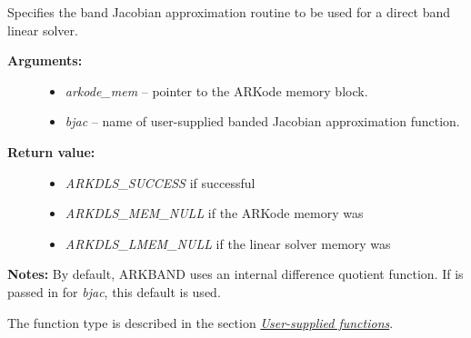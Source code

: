 \documentclass[letterpaper,10pt,english]{sphinxmanual}
\begin{document}
\begin{fulllineitems}
\label{c_interface/User_callable:ARKDlsSetBandJacFn}
Specifies the band Jacobian approximation routine to be
used for a direct band linear solver.
\begin{description}
\item[{\textbf{Arguments:}}] \leavevmode\begin{itemize}
\item {} 
\emph{arkode\_mem} -- pointer to the ARKode memory block.

\item {} 
\emph{bjac} -- name of user-supplied banded Jacobian approximation function.

\end{itemize}

\item[{\textbf{Return value:}}] \leavevmode\begin{itemize}
\item {} 
\emph{ARKDLS\_SUCCESS}  if successful

\item {} 
\emph{ARKDLS\_MEM\_NULL}  if the ARKode memory was 

\item {} 
\emph{ARKDLS\_LMEM\_NULL} if the linear solver memory was 

\end{itemize}

\end{description}

\textbf{Notes:} By default, ARKBAND uses an internal difference quotient
function.  If  is passed in for \emph{bjac}, this default is used.

The function type {\hyperref[c_interface/User_supplied:ARKDlsBandJacFn]{}} is described in the section
{\hyperref[c_interface/User_supplied:cinterface-usersupplied]{\emph{User-supplied functions}}}.

\end{fulllineitems}

\end{document}
